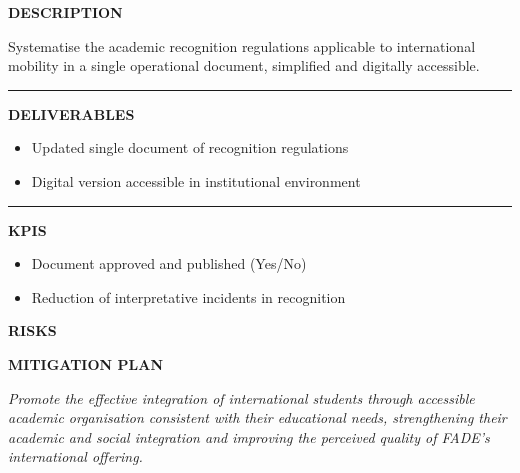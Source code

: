 \documentclass[11pt,a4paper]{scrreprt}
\newcommand{\fieldlabel}[1]{%
  {\footnotesize\sffamily\bfseries\color{mutedcolor}\MakeUppercase{#1}}\par\nopagebreak[4]
}
\newcommand{\fieldsep}{\vspace{3pt}\noindent\textcolor{bordercolor}{\rule{\linewidth}{0.4pt}}\vspace{3pt}\par}
\begin{document}
\begin{tcolorbox}[pabox={fgcolor}{A.P.2.2 \enspace\textbullet\enspace Regulatory Update on Recognition and Collection}]

\fieldlabel{Description}
{\small Systematise the academic recognition regulations applicable to international mobility in a single operational document, simplified and digitally accessible.}\par
\fieldsep
\fieldlabel{Deliverables}
{\small \begin{itemize}[noitemsep,topsep=2pt]
\item Updated single document of recognition regulations
\item Digital version accessible in institutional environment
\end{itemize}}\par
\fieldsep
\fieldlabel{KPIs}
{\small \begin{itemize}[noitemsep,topsep=2pt]
\item Document approved and published (Yes/No)
\item Reduction of interpretative incidents in recognition
\end{itemize}}\par
\end{tcolorbox}
\begin{tcolorbox}[riskbox]
{\footnotesize\sffamily\bfseries\color{red!50!black} RISKS}\par{}
\end{tcolorbox}
\begin{tcolorbox}[mitbox]
{\footnotesize\sffamily\bfseries\color{green!40!black} MITIGATION PLAN}\par{}
\end{tcolorbox}
\vspace{8pt}

\newpage
{}
{\small\color{mutedcolor}\itshape Promote the effective integration of international students through accessible academic organisation consistent with their educational needs, strengthening their academic and social integration and improving the perceived quality of FADE's international offering. }\par\vspace{6pt}
\end{document}
